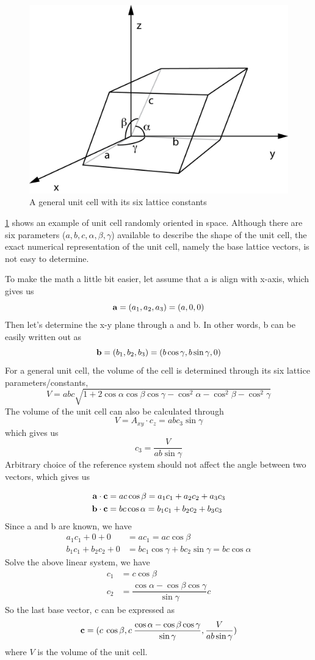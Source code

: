 \documentclass[12pt]{scrartcl}
\begin{document}
\begin{figure}[htp]
\centering
\includegraphics[width=.7\linewidth]{UnitCell.png}
\caption{A general unit cell with its six lattice constants}
\label{fig:unitcell}
\end{figure}

\cref{fig:unitcell} shows an example of unit cell randomly oriented in space.
Although there are six parameters ($a,b,c, \alpha, \beta, \gamma$) available to describe the shape of the unit cell, the exact numerical representation of the unit cell, namely the base lattice vectors, is not easy to determine.

To make the math a little bit easier, let assume that \vctr a is align with x-axis, which gives us
\[
	\mathbf{a} = (a_1, a_2, a_3) = (a, 0, 0)
\]
Then let's determine the x-y plane through \vctr a and \vctr b.
In other words, \vctr b can be easily written out as
\[
	\mathbf{b} = (b_1, b_2, b_3) = (b\cos\gamma, b\sin\gamma, 0)
\]
For a general unit cell, the volume of the cell is determined through its six lattice parameters/constants,
\[
	V = abc\sqrt{1 + 2\cos\alpha\cos\beta\cos\gamma - \cos^2\alpha-\cos^2\beta-\cos^2\gamma}
\]
The volume of the unit cell can also be calculated through
\[
	V = A_{xy}\cdot c_z = abc_3\sin\gamma
\]
which gives us
\[
	c_3 = \dfrac{V}{ab\sin\gamma}
\]
Arbitrary choice of the reference system should not affect the angle between two vectors, which gives us

\begin{align*}
	\mathbf{a} \cdot \mathbf{c} &= ac\cos\beta   = a_1c_1 + a_2c_2 + a_3c_3 \\
	\mathbf{b} \cdot \mathbf{c} &= bc\cos\alpha = b_1c_1 + b_2c_2 + b_3c_3
\end{align*}
Since \vctr a and \vctr b are known, we have
\begin{align*}
	a_1c_1 + 0 + 0 &= ac_1 = ac\cos\beta \\
	b_1c_1 + b_2c_2 + 0 &= bc_1\cos\gamma  + bc_2\sin\gamma  = bc\cos\alpha
\end{align*}
Solve the above linear system, we have
\begin{align*}
	c_1 &= c\cos\beta \\
	c_2 &= \dfrac{\cos\alpha - \cos\beta\cos\gamma}{\sin\gamma}c
\end{align*}
So the last base vector, \vctr c can be expressed as
\[
	\mathbf{c} = ( c \: \cos\beta,
	                c \: \dfrac{\cos\alpha - \cos\beta\cos\gamma}{\sin\gamma},
	                \dfrac{V}{ab\sin\gamma})
\]
where $V$ is the volume of the unit cell.
\end{document}
